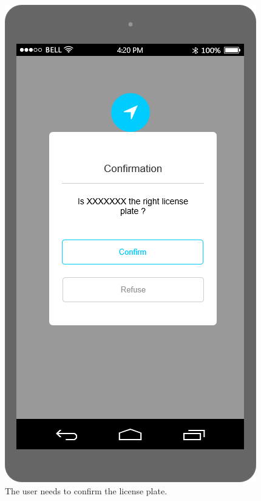 \documentclass[./main.tex]{subfiles}
\begin{document}
\clearpage

\begin{figure}
    \centering
    \begin{minipage}[t]{\mockupdimension}
        \includegraphics[width=\textwidth]{resources/Mockups/user_confirmation}
        \caption{The user needs to confirm the license plate. }
        \label{fig:user_confirmation}

\end{minipage}
\end{figure}
\end{document}
